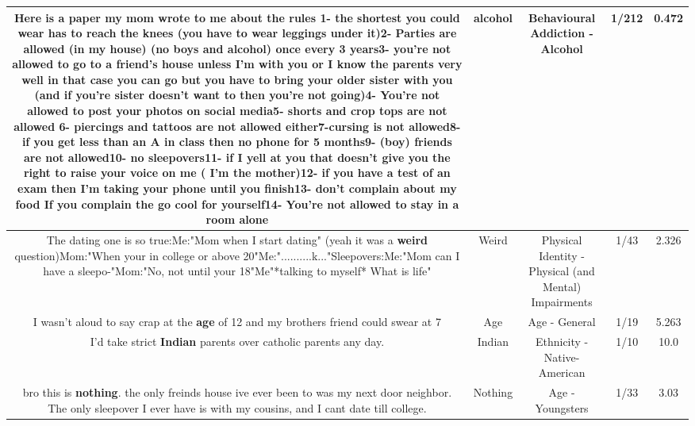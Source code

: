 \documentclass[11pt]{article}
\newlength\mylength
\begin{document}
\begin{center}
\begin{longtable}{|C{.65\mylength}|C{.30\mylength}|C{.12\mylength}|C{.12\mylength}|C{.12\mylength}|}
  \small Here is a paper my mom wrote to me about the rules 1- the shortest you could wear has to reach the knees (you have to wear leggings under it)2- Parties are allowed (in my house) (no boys and \textbf{alcohol}) once every 3 years3- you're not allowed to go to a friend's house unless I'm with you or I know the parents very well in that case you can go but you have to bring your older sister with you (and if you're sister doesn't want to then you're not going)4- You're not allowed to post your photos on social media5- shorts and crop tops are not allowed 6- piercings and tattoos are not allowed either7-cursing is not allowed8- if you get less than an A in class then no phone for 5 months9- (boy) friends are not allowed10- no sleepovers11- if I yell at you that doesn't give you the right to raise your voice on me ( I'm the mother)12- if you have a test of an exam then I'm taking your phone until you finish13- don't complain about my food If you complain the go cool for yourself14- You're not allowed to stay in a room alone\normalsize   & alcohol & Behavioural Addiction - Alcohol & 1/212 & 0.472 \\  \hline
  \small The dating one is so true:Me:"Mom when I start dating" (yeah it was a \textbf{weird} question)Mom:"When your in college or above 20"Me:"..........k..."Sleepovers:Me:"Mom can I have a sleepo-"Mom:"No, not until your 18"Me"*talking to myself* What is life"\normalsize   & Weird & Physical Identity - Physical (and Mental) Impairments & 1/43 & 2.326 \\  \hline
  \small I wasn't aloud to say crap at the \textbf{age} of 12 and my brothers friend could swear at 7\normalsize   & Age & Age - General & 1/19 & 5.263 \\  \hline
  \small I'd take strict \textbf{Indian} parents over catholic parents any day.\normalsize   & Indian & Ethnicity - Native-American & 1/10 & 10.0 \\  \hline
  \small bro this is \textbf{nothing}. the only freinds house ive ever been to was my next door neighbor. The only sleepover I ever have is with my cousins, and I cant date till college.\normalsize   & Nothing & Age - Youngsters & 1/33 & 3.03 \\  \hline

\end{longtable}
\end{center}
\end{document}
